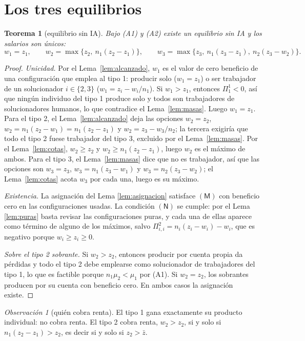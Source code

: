 \documentclass[11pt]{article}
\theoremstyle{plain}
\newtheorem{teorema}{Teorema}
\theoremstyle{definition}
\theoremstyle{remark}
\newtheorem*{obs}{Observación}
\newcommand{\N}{\mathsf{N}}
\newcommand{\Mk}{\mathsf{M}}
\begin{document}
\section{Los tres equilibrios}

\begin{teorema}[equilibrio sin IA]\label{th:pre}
Bajo (A1) y (A2) existe un equilibrio sin IA y los salarios son únicos:
\[
  w_1=z_1,\qquad
  w_2=\max\{z_2,\ n_1(z_2-z_1)\},\qquad
  w_3=\max\{z_3,\ n_1(z_3-z_1),\ n_2(z_3-w_2)\}.
\]
\end{teorema}

\begin{proof}
\emph{Unicidad.} Por el Lema~\ref{lem:alcanzado}, $w_1$ es el valor de cero beneficio de una
configuración que emplea al tipo 1: producir solo ($w_1=z_1$) o ser trabajador de un solucionador
$i\in\{2,3\}$ ($w_1=z_i-w_i/n_1$). Si $w_1>z_1$, entonces $\Pi^{1}_1<0$, así que ningún individuo del
tipo 1 produce solo y todos son trabajadores de solucionadores humanos, lo que contradice el
Lema~\ref{lem:masas}. Luego $w_1=z_1$. Para el tipo 2, el Lema~\ref{lem:alcanzado} deja las opciones
$w_2=z_2$, $w_2=n_1(z_2-w_1)=n_1(z_2-z_1)$ y $w_2=z_3-w_3/n_2$; la tercera exigiría que todo el tipo 2
fuese trabajador del tipo 3, excluido por el Lema~\ref{lem:masas}. Por el Lema~\ref{lem:cotas},
$w_2\ge z_2$ y $w_2\ge n_1(z_2-z_1)$, luego $w_2$ es el máximo de ambos. Para el tipo 3, el
Lema~\ref{lem:masas} dice que no es trabajador, así que las opciones son $w_3=z_3$,
$w_3=n_1(z_3-w_1)$ y $w_3=n_2(z_3-w_2)$; el Lema~\ref{lem:cotas} acota $w_3$ por cada una, luego es su
máximo.

\emph{Existencia.} La asignación del Lema \ref{lem:asignacion} satisface $(\Mk)$ con beneficio cero
en las configuraciones usadas. La condición $(\N)$ se cumple: por el Lema \ref{lem:puras} basta
revisar las configuraciones puras, y cada una de ellas aparece como término de alguno de los máximos,
salvo $\Pi^{2}_{i,i}=n_i(z_i-w_i)-w_i$, que es negativo porque $w_i\ge z_i\ge0$.

\emph{Sobre el tipo 2 sobrante.} Si $w_2>z_2$, entonces producir por cuenta propia da pérdidas y todo
el tipo 2 debe emplearse como solucionador de trabajadores del tipo 1, lo que es factible porque
$n_1\mu_2<\mu_1$ por (A1). Si $w_2=z_2$, los sobrantes producen por su cuenta con beneficio cero. En
ambos casos la asignación existe.

\end{proof}

\begin{obs}[quién cobra renta]\label{obs:renta}
El tipo 1 gana exactamente su producto individual: no cobra renta. El tipo 2 cobra renta,
$w_2>z_2$, si y solo si $n_1(z_2-z_1)>z_2$, es decir si y solo si $z_2>\bar z$.
\end{obs}
\end{document}
